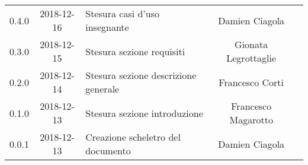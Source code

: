 {\begin{longtable}{ c c C{6cm} c c }
		0.4.0 & 
		2018-12-16 &  
		Stesura casi d'uso insegnante &	
		Damien Ciagola &	
		\reda{} \\
		
		0.3.0 & 
		2018-12-15 &  
		Stesura sezione requisiti &	
		Gionata Legrottaglie &	
		\reda{} \\
		
		0.2.0 & 
		2018-12-14 &  
		Stesura sezione descrizione generale	&	
		Francesco Corti &
		\reda{} \\
		
		0.1.0 & 
		2018-12-13 &  
		Stesura sezione introduzione &	
		Francesco Magarotto &	
		\reda{}  \\
		
		0.0.1 & 
		2018-12-13 &  
		Creazione scheletro del documento&	
		Damien Ciagola  &	
		\reda{}  \\
	\end{longtable}

}
